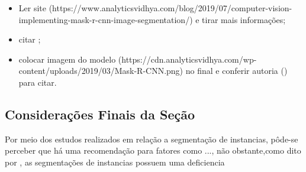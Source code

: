 \begin{itemize}
    \item Ler site (https://www.analyticsvidhya.com/blog/2019/07/computer-vision-implementing-mask-r-cnn-image-segmentation/) e tirar mais informações;
    \item citar \cite{He2020};
    \item colocar imagem do modelo (https://cdn.analyticsvidhya.com/wp-content/uploads/2019/03/Mask-R-CNN.png) no final e conferir autoria (\cite{He2020}) para citar.
\end{itemize}

\subsection{Considerações Finais da Seção}
\label{instance:conclusion}

Por meio dos estudos realizados em relação a segmentação de instancias, pôde-se perceber que há uma recomendação para fatores como ..., não obstante,como dito por \cite{Kirillov2019a}, as segmentações de instancias possuem uma deficiencia 